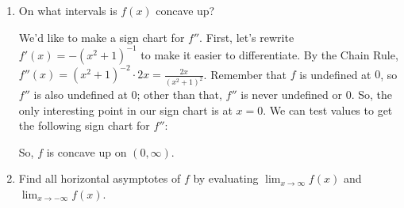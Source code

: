 \documentclass{article}
\begin{document}
\begin{enumerate}
\begin{enumerate}
  \item
    \begin{problem}[\vfill]
      On what intervals is $f(x)$ concave up? 
    \end{problem}

    \begin{solution}
      We'd like to make a sign chart for $f''$.  First, let's rewrite
      $f'(x) = - (x^2 + 1)^{-1}$ to make it easier to differentiate.  By
      the Chain Rule, $\displaystyle f''(x) = (x^2 + 1)^{-2} \cdot 2x =
      \frac{2x}{(x^2 + 1)^2}$.  Remember that $f$ is undefined at $0$, so
      $f''$ is also undefined at $0$; other than that, $f''$ is never
      undefined or 0.  So, the only interesting point in our sign chart is
      at $x = 0$.  We can test values to get the following sign chart for
      $f''$:
        \begin{center}
      \end{center}
      So, $f$ is concave up on $(0, \infty)$. 
    \end{solution}

  \item
    \begin{problem}[\vfill]
      Find all horizontal asymptotes of $f$ by evaluating $\displaystyle
      \lim_{x \to \infty} f(x)$ and $\displaystyle \lim_{x \to -\infty} f(x)$.
    \end{problem}


\end{enumerate}
\end{enumerate}
\end{document}
